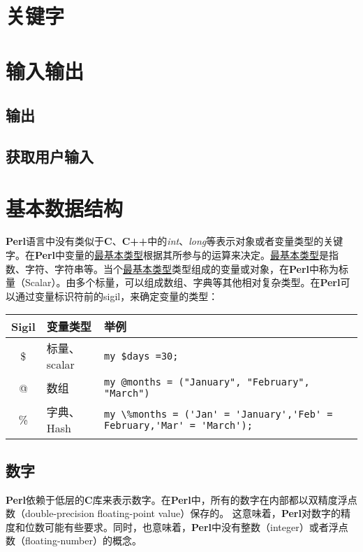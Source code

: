 \documentclass[11pt]{book}
\newcommand{\programmingkeywords}[1]{\textit{{\color{blue}#1}}}
\newcommand{\programminglanguage}[1]{\textbf{#1}}
\begin{document}
	\chapter{关键字}
	
	\chapter{输入输出}
		\section{输出}
		\section{获取用户输入}
		
	\chapter{基本数据结构}
		\programminglanguage{Perl}语言中没有类似于\programminglanguage{C}、\programminglanguage{C++}中的\programmingkeywords{int}、\programmingkeywords{long}等表示对象或者变量类型的关键字。在\programminglanguage{Perl}中变量的\uline{最基本类型}根据其所参与的运算来决定。\uline{最基本类型}是指数、字符、字符串等。当个\uline{最基本类型}类型组成的变量或对象，在\programminglanguage{Perl}中称为标量（Scalar）。由多个标量，可以组成数组、字典等其他相对复杂类型。在\programminglanguage{Perl}可以通过变量标识符前的sigil，来确定变量的类型：
		
		\begin{tabular}{|c|l|l|}
			\hline
			Sigil & 变量类型 & 举例 \\
			\hline
			\$ & 标量、scalar & \lstinline!my $days =30;! \\
			\hline
			@ & 数组 & \lstinline!my @months = ("January", "February", "March")! \\
			\hline
			\% & 字典、Hash & \lstinline!my \%months = ('Jan' = 'January','Feb' = February,'Mar' = 'March');! \\
			\hline
		\end{tabular}
	
		\section{数字}
			\programminglanguage{Perl}依赖于低层的\programminglanguage{C}库来表示数字。在\programminglanguage{Perl}中，所有的数字在内部都以双精度浮点数（double-precision floating-point value）保存的。 这意味着，\programminglanguage{Perl}对数字的精度和位数可能有些要求。同时，也意味着，\programminglanguage{Perl}中没有整数（integer）或者浮点数（floating-number）的概念。
			
\end{document}
